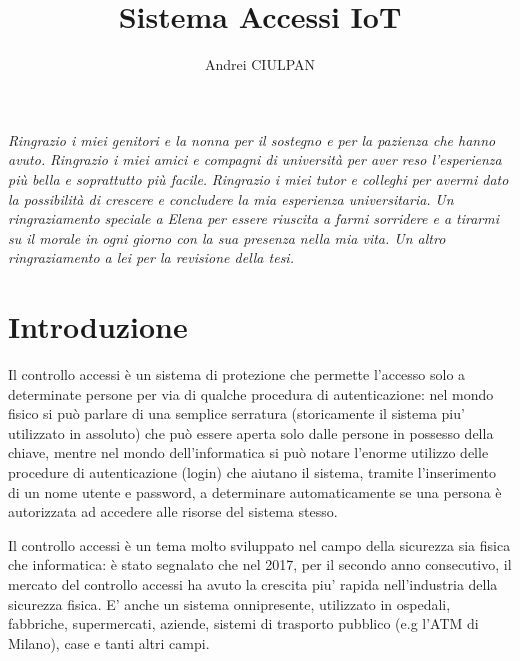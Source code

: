 \documentclass[12pt]{report}
\newcommand\blankpage{%
	\null
	\thispagestyle{empty}%
	\addtocounter{page}{-1}%
	\newpage}
\begin{document}
\title{Sistema Accessi IoT}
\author{Andrei CIULPAN}
\afterpage{\blankpage}
% 
%
\beforepreface

{\hfill \footnotesize {\sl Ringrazio i miei genitori e la nonna per il sostegno e per la pazienza che hanno avuto.}}
\vskip 0.8cm
{\hfill \footnotesize {\sl Ringrazio i miei amici e compagni di università per aver reso l'esperienza più bella e soprattutto più facile.}}
\vskip 0.8cm
{\hfill \footnotesize {\sl Ringrazio i miei tutor e colleghi per avermi dato la possibilità di crescere e concludere la mia esperienza universitaria.}}
\vskip 0.8cm
{\hfill \footnotesize {\sl Un ringraziamento speciale a Elena per essere riuscita a farmi sorridere e a tirarmi su il morale in ogni giorno con la sua presenza nella mia vita.  Un altro ringraziamento a lei per la revisione della tesi.}}
       

\afterpreface

% 
\chapter{Introduzione}
\label{cap1}
%

Il controllo accessi è un sistema di protezione che permette l'accesso solo a determinate persone per via di qualche procedura di autenticazione: nel mondo fisico si può parlare di una semplice serratura (storicamente il sistema piu' utilizzato in assoluto) che può essere aperta solo dalle persone in possesso della chiave, mentre nel mondo dell'informatica si può notare l'enorme utilizzo delle procedure di autenticazione (login) che aiutano il sistema, tramite l'inserimento di un nome utente e password, a determinare automaticamente se una persona è autorizzata ad accedere alle risorse del sistema stesso.

Il controllo accessi\cite{controllo_accessi} è un tema molto sviluppato nel campo della sicurezza sia fisica che informatica: è stato segnalato che nel 2017, per il secondo anno consecutivo, il mercato del controllo accessi ha avuto la crescita piu' rapida nell'industria della sicurezza fisica\cite{crescita_controllo_accessi}. E' anche un sistema onnipresente, utilizzato in ospedali, fabbriche, supermercati, aziende, sistemi di trasporto pubblico (e.g l'ATM di Milano), case e tanti altri campi.  
\end{document}

